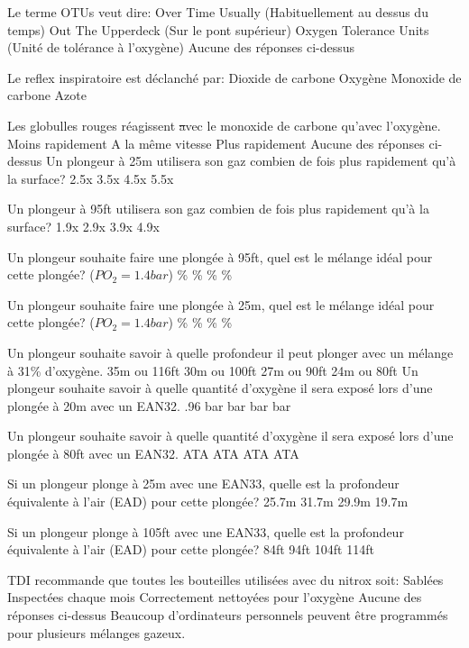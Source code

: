 \documentclass[english,10pt,a4paper, twoside]{article}
\begin{document}
\begin{outline}
		\1 Le terme OTUs veut dire:
			\2 Over Time Usually (Habituellement au dessus du temps)
			\2 Out The Upperdeck (Sur le pont supérieur)
			\2 Oxygen Tolerance Units (Unité de tolérance à l'oxygène)
			\2 Aucune des réponses ci-dessus

		\1 Le reflex inspiratoire est déclanché par:
			\2 Dioxide de carbone
			\2 Oxygène
			\2 Monoxide de carbone
			\2 Azote			

		\1 Les globulles rouges réagissent \st avec le monoxide de carbone qu'avec l'oxygène.
			\2 Moins rapidement
			\2 A la même vitesse
			\2 Plus rapidement
			\2 Aucune des réponses ci-dessus
		\1 Un plongeur à 25m utilisera son gaz combien de fois plus rapidement qu'à la surface?
			\2 2.5x
			\2 3.5x
			\2 4.5x
			\2 5.5x

		\1 Un plongeur à 95ft utilisera son gaz combien de fois plus rapidement qu'à la surface?
			\2 1.9x
			\2 2.9x
			\2 3.9x
			\2 4.9x

		\1 Un plongeur souhaite faire une plongée à 95ft, quel est le mélange idéal pour cette plongée? ($PO_2 = 1.4bar$)
			\%
			\%
			\%
			\%

		\1 Un plongeur souhaite faire une plongée à 25m, quel est le mélange idéal pour cette plongée? ($PO_2 = 1.4bar$)
			\%
			\%
			\%
			\%

		\1 Un plongeur souhaite savoir à quelle profondeur il peut plonger avec un mélange à 31\% d'oxygène.
			\2 35m ou 116ft
			\2 30m ou 100ft
			\2 27m ou 90ft
			\2 24m ou 80ft
		\1 Un plongeur souhaite savoir à quelle quantité d'oxygène il sera exposé lors d'une plongée à 20m avec un EAN32.
			\2 .96 bar
			\2 1.16 bar
			 bar
			 bar

		\1 Un plongeur souhaite savoir à quelle quantité d'oxygène il sera exposé lors d'une plongée à 80ft avec un EAN32.
			 ATA
			 ATA
			 ATA
			 ATA

		\1 Si un plongeur plonge à 25m avec une EAN33, quelle est la profondeur équivalente à l'air (EAD) pour cette plongée?
			\2 25.7m
			\2 31.7m
			\2 29.9m
			\2 19.7m

		\1 Si un plongeur plonge à 105ft avec une EAN33, quelle est la profondeur équivalente à l'air (EAD) pour cette plongée?
			\2 84ft
			\2 94ft
			\2 104ft
			\2 114ft

		\1 TDI recommande que toutes les bouteilles utilisées avec du nitrox soit:
			\2 Sablées
			\2 Inspectées chaque mois
			\2 Correctement nettoyées pour l'oxygène
			\2 Aucune des réponses ci-dessus
		\1 Beaucoup d'ordinateurs personnels peuvent être programmés pour plusieurs mélanges gazeux. \vf
		

\end{outline}
\end{document}
